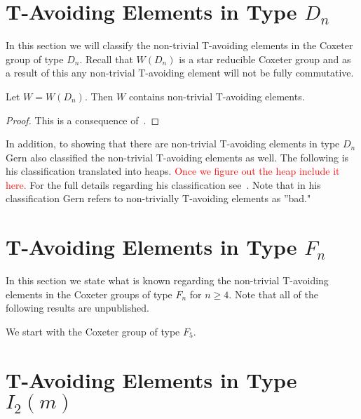 
\section{T-Avoiding Elements in Type $D_n$}

In this section we will classify the non-trivial T-avoiding elements in the Coxeter group of type $D_n$. Recall that $W(D_n)$ is a star reducible Coxeter group and as a result of this any non-trivial T-avoiding element will not be fully commutative.

\begin{theorem}
Let $W=W(D_n)$. Then $W$ contains non-trivial T-avoiding elements.
\begin{proof}
	This is a consequence of~\cite[Section 2.2]{Gern2013a}.
\end{proof}
\end{theorem}

In addition, to showing that there are non-trivial T-avoiding elements in type $D_n$ Gern also classified the non-trivial T-avoiding elements as well. The following is his classification translated into heaps. \textcolor{red}{Once we figure out the heap include it here.} For the full details regarding his classification see~\cite{Gern2013a}. Note that in his classification Gern  refers to non-trivially T-avoiding elements as ''bad."


\section{T-Avoiding Elements in Type $F_n$}

In this section we state what is known regarding the non-trivial T-avoiding elements in the Coxeter groups of type $F_n$ for $n \geq 4$. Note that all of the following results are unpublished. 

We start with the Coxeter group of type $F_5$. 



\section{T-Avoiding Elements in Type $I_2(m)$}

